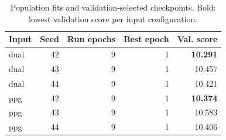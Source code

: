 \begin{table}[t]
\centering\caption{Population fits and validation-selected checkpoints. Bold: lowest validation score per input configuration.}\label{tab:epochs}
\scriptsize
\setlength{\tabcolsep}{4pt}
\begin{tabular}{lrrrr}\toprule
Input & Seed & Run epochs & Best epoch & Val. score\\\midrule
dual & 42 & 9 & 1 & \textbf{10.291}\\
dual & 43 & 9 & 1 & 10.457\\
dual & 44 & 9 & 1 & 10.421\\
ppg & 42 & 9 & 1 & \textbf{10.374}\\
ppg & 43 & 9 & 1 & 10.583\\
ppg & 44 & 9 & 1 & 10.406\\
\bottomrule\end{tabular}
\end{table}
